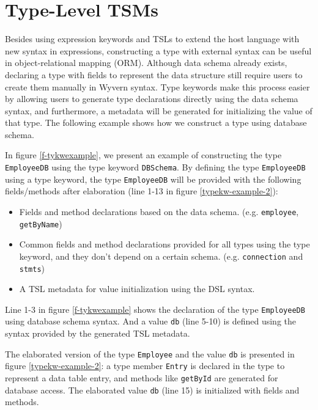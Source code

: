 \documentclass{sig-alternate}
\begin{document}
\section{Type-Level TSMs}
Besides using expression keywords and TSLs to extend the host language with new syntax in expressions, constructing a type with external syntax can be useful in object-relational mapping (ORM). Although data schema already exists, declaring a type with fields to represent the data structure still require users to create them manually in Wyvern syntax. Type keywords make this process easier by allowing users to generate type declarations directly using the data schema syntax, and furthermore, a metadata will be generated for initializing the value of that type. The following example shows how we construct a type using database schema.



In figure \ref{f-tykwexample}, we present an example of constructing the type \verb|EmployeeDB| using the type keyword \verb|DBSchema|. By defining the type \verb|EmployeeDB| using a type keyword, the type \verb|EmployeeDB| will be provided with the following fields/methods after elaboration (line 1-13 in figure \ref{typekw-example-2}):
\begin{itemize}\setlength{\itemsep}{0pt}
\item Fields and method declarations based on the data schema. (e.g. \verb|employee|, \verb|getByName|)
\item Common fields and method declarations provided for all types using the type keyword, and they don't depend on a certain schema. (e.g. \verb|connection| and \verb|stmts|)
\item A TSL metadata for value initialization using the DSL syntax.
\end{itemize}

Line 1-3 in figure \ref{f-tykwexample} shows the declaration of the type \verb|EmployeeDB| using database schema syntax. And a value \verb|db| (line 5-10) is defined using the syntax provided by the generated TSL metadata. 

The elaborated version of the type \verb|Employee| and the value \verb|db| is presented in figure \ref{typekw-example-2}: a type member \verb|Entry| is declared in the type to represent a data table entry, and methods like \verb|getById| are generated for database access. The elaborated value \verb|db| (line 15) is initialized with fields and methods.
\end{document}
